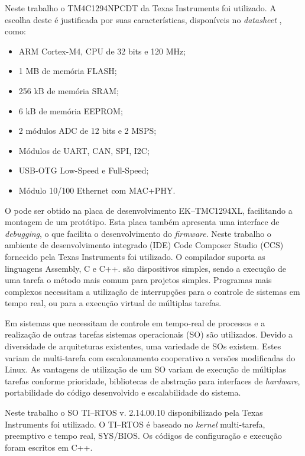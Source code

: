 		Neste trabalho o  TM4C1294NPCDT da Texas Instruments\textsuperscript{\textregistered} foi utilizado. A escolha deste  é justificada por suas características, disponíveis no \textit{datasheet} \cite{tm4c1294}, como:

		\begin{itemize}
			\item ARM Cortex-M4, CPU de 32 bits e 120 MHz;
			\item 1 MB de memória FLASH;
			\item 256 kB de memória SRAM;
			\item 6 kB de memória EEPROM;
			\item 2 módulos ADC de 12 bits e 2 MSPS;
			\item Módulos de UART, CAN, SPI, I2C;
			\item USB-OTG Low-Speed e Full-Speed;
			\item Módulo 10/100 Ethernet com MAC+PHY.
		\end{itemize}

		O  pode ser obtido na placa de desenvolvimento EK--TMC1294XL, facilitando a montagem de um protótipo. Esta placa também apresenta uma interface de \textit{debugging}, o que facilita o desenvolvimento do \textit{firmware}. Neste trabalho o ambiente de desenvolvimento integrado (IDE) Code Composer Studio (CCS) fornecido pela Texas Instruments\textsuperscript{\textregistered} foi utilizado. O compilador suporta as linguagens Assembly, C e C++.  são dispositivos simples, sendo a execução de uma tarefa o método mais comum para projetos simples. Programas mais complexos necessitam a utilização de interrupções para o controle de sistemas em tempo real, ou para a execução virtual de múltiplas tarefas.

		Em sistemas que necessitam de controle em tempo-real de processos e a realização de outras tarefas sistemas operacionais (SO) são utilizados. Devido a diversidade de arquiteturas existentes, uma variedade de SOs existem. Estes variam de multi-tarefa com escalonamento cooperativo a versões modificadas do Linux\textsuperscript{\textregistered}. As vantagens de utilização de um SO variam de execução de múltiplas tarefas conforme prioridade, bibliotecas de abstração para interfaces de \textit{hardware}, portabilidade do código desenvolvido e escalabilidade do sistema.

		Neste trabalho o SO TI--RTOS v. 2.14.00.10 disponibilizado pela Texas Instruments\textsuperscript{\textregistered} foi utilizado. O TI--RTOS é baseado no \textit{kernel} multi-tarefa, preemptivo e tempo real, SYS/BIOS. Os códigos de configuração e execução foram escritos em C++.

